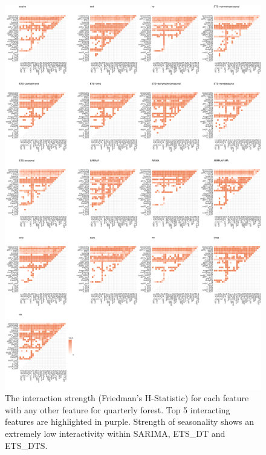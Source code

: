 \documentclass[11pt,a4paper,]{article}
\begin{document}
\begin{figure}
\centering
\includegraphics{figures/friedmanq-1.pdf}
\caption{\label{fig:friedmanq}The interaction strength (Friedman's H-Statistic) for each feature with any other feature for quarterly forest. Top 5 interacting features are highlighted in purple. Strength of seasonality shows an extremely low interactivity within SARIMA, ETS\_DT and ETS\_DTS.}
\end{figure}
\end{document}

